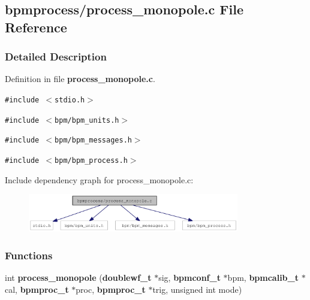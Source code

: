 \subsection{bpmprocess/process\_\-monopole.c File Reference}
\label{process__monopole_8c}


\subsubsection{Detailed Description}


Definition in file {\bf process\_\-monopole.c}.

{\tt \#include $<$stdio.h$>$}\par
{\tt \#include $<$bpm/bpm\_\-units.h$>$}\par
{\tt \#include $<$bpm/bpm\_\-messages.h$>$}\par
{\tt \#include $<$bpm/bpm\_\-process.h$>$}\par


Include dependency graph for process\_\-monopole.c:\nopagebreak
\begin{figure}[H]
\begin{center}
\leavevmode
\includegraphics[width=261pt]{process__monopole_8c__incl}
\end{center}
\end{figure}
\subsubsection*{Functions}
\begin{CompactItemize}
\item 
int {\bf process\_\-monopole} ({\bf doublewf\_\-t} $\ast$sig, {\bf bpmconf\_\-t} $\ast$bpm, {\bf bpmcalib\_\-t} $\ast$cal, {\bf bpmproc\_\-t} $\ast$proc, {\bf bpmproc\_\-t} $\ast$trig, unsigned int mode)
\end{CompactItemize}
